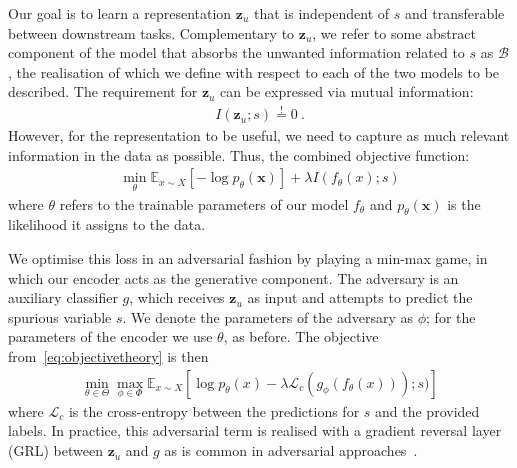 Our goal is to learn a representation $\bm{z}_u$ that is independent of $s$ and transferable between downstream tasks.
Complementary to $\bm{z}_u$, we refer to some abstract component of the model that absorbs the unwanted information related to $s$ as $\mathcal{B}$, the realisation of which we define with respect to each of the two models to be described.
The requirement for $\bm{z}_u$ can be expressed via mutual information:
\begin{align}
  I(\bm{z}_u;s) \overset{!}{=} 0~.
  \label{eq:migoal}
\end{align}
However, for the representation to be useful, we need to capture as much relevant information in the data as possible.
Thus, the combined objective function:
\begin{align}
  \min_{\theta} \mathbb{E}_{x \sim X}[-\log p_\theta(\bm{x})] + \lambda I(f_\theta(x);s)
  \label{eq:objectivetheory}
\end{align}
where $\theta$ refers to the trainable parameters of our model $f_\theta$ and $p_\theta(\bm{x})$ is the likelihood it assigns to the data.

We optimise this loss in an adversarial fashion by playing a min-max game, in which our encoder acts as the generative component.
The adversary is an auxiliary classifier $g$, which receives $\bm{z}_u$ as input and attempts to predict the spurious variable $s$.
We denote the parameters of the adversary as $\phi$;
for the parameters of the encoder we use $\theta$, as before.
The objective from~\eqref{eq:objectivetheory} is then%
\begin{align}
  \min_{\theta\in\Theta} \max_{\phi\in\Phi} \mathbb{E}_{x \sim X}[\log p_\theta(x) -\lambda\mathcal{L}_c(g_\phi(f_\theta(x))); s)]
  \label{eq:objectivepractical}
\end{align}
where $\mathcal{L}_c$ is the cross-entropy between the predictions for $s$ and the provided labels.
In practice, this adversarial term is realised with a gradient reversal layer (GRL) \citep{ganin2016domain} between $\bm{z}_u$ and $g$ as is common in adversarial approaches~\citep{edwards2016censoring}.

